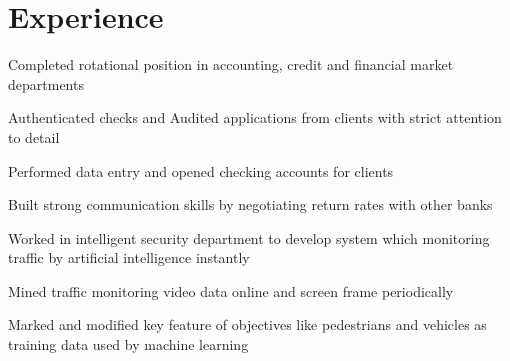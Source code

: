 \documentclass[letterpaper]{deedy-resume} %
\begin{document}
\begin{minipage}[t]{0.66\textwidth} %


\section{Experience}


\vspace{\topsep} %
\begin{tightitemize}
\item  Completed rotational position in accounting, credit and financial market departments
\item Authenticated checks and Audited applications from clients with strict attention to detail
\item Performed data entry and opened checking accounts for clients
\item Built strong communication skills by negotiating return rates with other banks
\end{tightitemize}

\sectionspace %



\begin{tightitemize}
\item Worked in intelligent security department to develop system which monitoring traffic by artificial intelligence instantly
\item Mined traffic monitoring video data online and screen frame periodically
\item Marked and modified key feature of objectives like pedestrians and vehicles as training data used by machine learning
\end{tightitemize}

\sectionspace %



\end{minipage}
\end{document}
